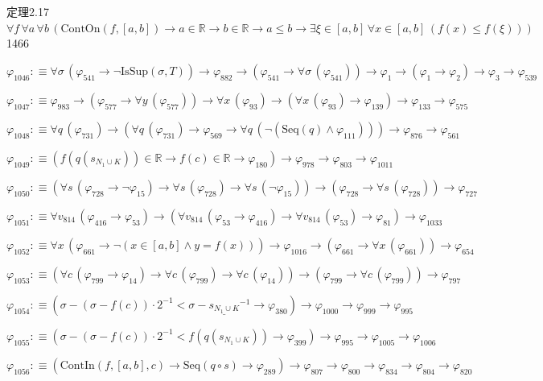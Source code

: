 \begin{fullproof}{定理2.17}{$\forall f\,\forall a\,\forall b\,(\mathrm{ContOn}(f,[a,b]) \to a \in \mathbb{R} \to b \in \mathbb{R} \to a \leq b \to \exists \xi \in [a,b]\,\forall x \in [a,b]\,(f(x) \leq f(\xi)))$}{1466}
\begin{abbrevlist}
\item $\varphi_{1046} :\equiv \forall \sigma\,(\varphi_{541} \to \neg \mathrm{IsSup}(\sigma,T)) \to \varphi_{882} \to (\varphi_{541} \to \forall \sigma\,(\varphi_{541})) \to \varphi_{1} \to (\varphi_{1} \to \varphi_{2}) \to \varphi_{3} \to \varphi_{539}$
\item $\varphi_{1047} :\equiv \varphi_{983} \to (\varphi_{577} \to \forall y\,(\varphi_{577})) \to \forall x\,(\varphi_{93}) \to (\forall x\,(\varphi_{93}) \to \varphi_{139}) \to \varphi_{133} \to \varphi_{575}$
\item $\varphi_{1048} :\equiv \forall q\,(\varphi_{731}) \to (\forall q\,(\varphi_{731}) \to \varphi_{569} \to \forall q\,(\neg (\mathrm{Seq}(q) \land \varphi_{111}))) \to \varphi_{876} \to \varphi_{561}$
\item $\varphi_{1049} :\equiv (f(q(s_{N_{1} \cup K})) \in \mathbb{R} \to f(c) \in \mathbb{R} \to \varphi_{180}) \to \varphi_{978} \to \varphi_{803} \to \varphi_{1011}$
\item $\varphi_{1050} :\equiv (\forall s\,(\varphi_{728} \to \neg \varphi_{15}) \to \forall s\,(\varphi_{728}) \to \forall s\,(\neg \varphi_{15})) \to (\varphi_{728} \to \forall s\,(\varphi_{728})) \to \varphi_{727}$
\item $\varphi_{1051} :\equiv \forall v_{814}\,(\varphi_{416} \to \varphi_{53}) \to (\forall v_{814}\,(\varphi_{53} \to \varphi_{416}) \to \forall v_{814}\,(\varphi_{53}) \to \varphi_{81}) \to \varphi_{1033}$
\item $\varphi_{1052} :\equiv \forall x\,(\varphi_{661} \to \neg (x \in [a,b] \land y = f(x))) \to \varphi_{1016} \to (\varphi_{661} \to \forall x\,(\varphi_{661})) \to \varphi_{654}$
\item $\varphi_{1053} :\equiv (\forall c\,(\varphi_{799} \to \varphi_{14}) \to \forall c\,(\varphi_{799}) \to \forall c\,(\varphi_{14})) \to (\varphi_{799} \to \forall c\,(\varphi_{799})) \to \varphi_{797}$
\item $\varphi_{1054} :\equiv (\sigma - (\sigma - f(c)) \cdot 2^{-1} < \sigma - \underline{s_{N_{1} \cup K}}^{-1} \to \varphi_{380}) \to \varphi_{1000} \to \varphi_{999} \to \varphi_{995}$
\item $\varphi_{1055} :\equiv (\sigma - (\sigma - f(c)) \cdot 2^{-1} < f(q(s_{N_{1} \cup K})) \to \varphi_{399}) \to \varphi_{995} \to \varphi_{1005} \to \varphi_{1006}$
\item $\varphi_{1056} :\equiv (\mathrm{ContIn}(f,[a,b],c) \to \mathrm{Seq}(q \circ s) \to \varphi_{289}) \to \varphi_{807} \to \varphi_{800} \to \varphi_{834} \to \varphi_{804} \to \varphi_{820}$

\end{abbrevlist}
\end{fullproof}
